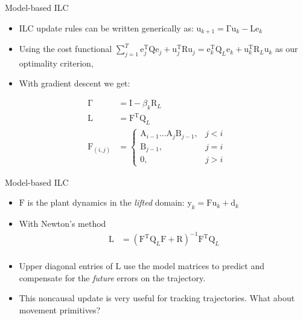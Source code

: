 \documentclass[handout]{beamer}
\newcommand{\boldvec}[1]{\boldsymbol{\mathrm{#1}}}
\let\vec\boldvec
\newcommand{\state}{\vec{y}} %
\newcommand{\error}{\vec{e}} %
\newcommand{\linDist}{\vec{d}} %
\newcommand{\sysInput}{\vec{u}} %
\newcommand{\qmatrix}{\vec{\Gamma}} %
\newcommand{\lmatrix}{\vec{L}} %
\begin{document}
%
\begin{frame}{Model-based ILC}
\begin{itemize}
\item ILC update rules can be written generically as: $\sysInput_{k+1} = \qmatrix\sysInput_{k} - \lmatrix\error_{k}$
\item Using the cost functional $\sum_{j=1}^{T} \error_j^{\mathrm{T}}\vec{Q}\error_j + \sysInput_j^{\mathrm{T}}\vec{R}\sysInput_j = \error_k^{\mathrm{T}}\vec{Q}_L\error_k + \sysInput_k^{\mathrm{T}}\vec{R}_L\sysInput_k$ as our optimality criterion,
\item With gradient descent we get: 
\end{itemize}
\begin{equation*}
\begin{aligned}
\qmatrix &= \vec{I} - \beta_k \vec{R}_L \\
\lmatrix &= \vec{F}^{\mathrm{T}}\vec{Q}_L \\
\vec{F}_{(i,j)} &= \left \{
\begin{array}{cc}
\vec{A}_{i-1}\ldots \vec{A}_j\vec{B}_{j-1}, & j < i \\ 
\vec{B}_{j-1}, & j = i \\
\vec{0}, & j > i 
\end{array} \right.
\end{aligned}
\end{equation*}
\end{frame}
%
\begin{frame}{Model-based ILC}
\begin{itemize}
\item $\vec{F}$ is the plant dynamics in the \emph{lifted} domain: $\state_k = \vec{F}\sysInput_k + \linDist_k$
\item With Newton's method 
\begin{equation*}
\begin{aligned}
\lmatrix &= (\vec{F}^{\mathrm{T}}\vec{Q}_L\vec{F} + \vec{R})^{-1}\vec{F}^{\mathrm{T}}\vec{Q}_L \\
\end{aligned}
\end{equation*}
\item Upper diagonal entries of $\lmatrix$ use the model matrices to predict and compensate for the \emph{future} errors on the trajectory. 
\item This noncausal update is very useful for tracking trajectories. What about movement primitives?
\end{itemize}
\end{frame}
%
\end{document}
